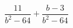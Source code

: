 \begin{ex}
	\begin{condition}
		\( \dfrac{11}{b^2-64}+\dfrac{b-3}{b^2-64} \)
	\end{condition}
\end{ex}